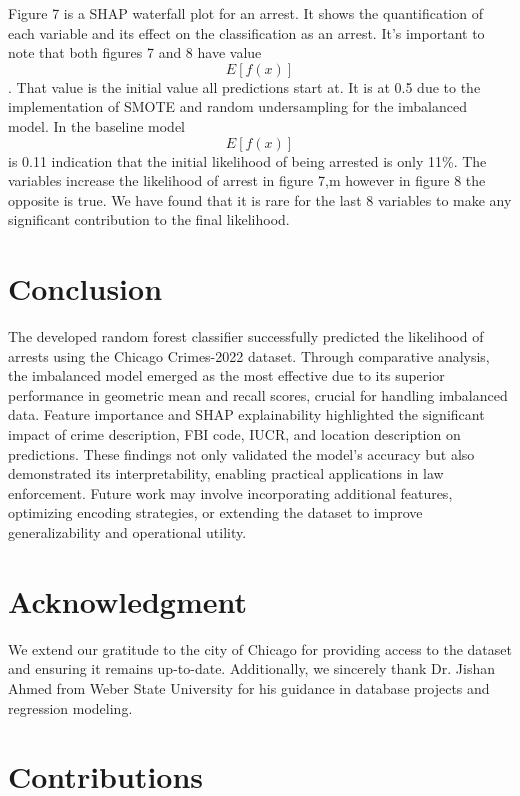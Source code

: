 \documentclass[conference]{IEEEtran}
\begin{document}
Figure 7 is a SHAP waterfall plot for an arrest. It shows the quantification of each variable and its effect on the classification as an arrest. It's important to note that both figures 7 and 8 have value \begin{equation}
	E[f(x)]
	\end{equation}. That value is the initial value all predictions start at. It is at 0.5  due to the implementation of SMOTE and random undersampling for the imbalanced model. In the baseline model \begin{equation}
		E[f(x)]
		\end{equation} is 0.11 indication that the initial likelihood of being arrested is only 11\%.  The variables increase the likelihood of arrest in figure 7,m however in figure 8 the opposite is true. We have found that it is rare for the last 8 variables to make any significant contribution to the final likelihood.


\section{Conclusion}
The developed random forest classifier successfully predicted the likelihood of arrests using the Chicago Crimes-2022 dataset. Through comparative analysis, the imbalanced model emerged as the most effective due to its superior performance in geometric mean and recall scores, crucial for handling imbalanced data. Feature importance and SHAP explainability highlighted the significant impact of crime description, FBI code, IUCR, and location description on predictions. These findings not only validated the model's accuracy but also demonstrated its interpretability, enabling practical applications in law enforcement. Future work may involve incorporating additional features, optimizing encoding strategies, or extending the dataset to improve generalizability and operational utility.

\section*{Acknowledgment}
We extend our gratitude to the city of Chicago for providing access to the dataset and ensuring it remains up-to-date. Additionally, we sincerely thank Dr. Jishan Ahmed from Weber State University for his guidance in database projects and regression modeling. 

\section{Contributions}
\end{document}
